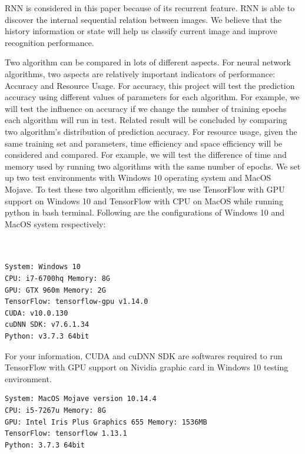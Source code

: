 \documentclass[letterpaper]{article} %
\begin{document}
RNN is considered in this paper because of its recurrent feature. RNN is able to discover the internal sequential relation between images. We believe that the history information or state will help us classify current image and improve recognition performance.

Two algorithm can be compared in lots of different aspects. For neural network algorithms, two aspects are relatively important indicators of performance: Accuracy and Resource Usage. For accuracy, this project will test the prediction accuracy using different values of parameters for each algorithm. For example, we will test the influence on accuracy if we change the number of training epochs each algorithm will run in test. Related result will be concluded by comparing two algorithm’s distribution of prediction accuracy. For resource usage, given the same training set and parameters, time efficiency and space efficiency will be considered and compared. For example, we will test the difference of time and memory used by running two algorithms with the same number of epochs.
We set up two test environments with Windows 10 operating system and MacOS Mojave. To test these two algorithm efficiently, we use TensorFlow with GPU support on Windows 10 and TensorFlow with CPU on MacOS while running python in bash terminal. Following are the configurations of Windows 10 and MacOS system respectively: \\ \\ \\
\begin{lstlisting}[columns=fullflexible, keepspaces=true, stepnumber=1]
System: Windows 10
CPU: i7-6700hq Memory: 8G
GPU: GTX 960m Memory: 2G
TensorFlow: tensorflow-gpu v1.14.0
CUDA: v10.0.130
cuDNN SDK: v7.6.1.34
Python: v3.7.3 64bit
\end{lstlisting}
For your information, CUDA and cuDNN SDK are softwares required to run TensorFlow with GPU support on Nividia graphic card in Windows 10 testing environment.
\begin{lstlisting}[columns=fullflexible, keepspaces=true, stepnumber=1]
System: MacOS Mojave version 10.14.4
CPU: i5-7267u Memory: 8G
GPU: Intel Iris Plus Graphics 655 Memory: 1536MB
TensorFlow: tensorflow 1.13.1
Python: 3.7.3 64bit
\end{lstlisting}



\newpage


\end{document}
